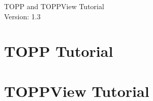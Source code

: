 \documentclass[a4paper]{article}
\begin{document}
\begin{titlepage}
\vspace*{7cm}
\begin{center}
{\Large TOPP and TOPPView Tutorial\\[1ex]\large Version: 1.3 }\\
\end{center}
\end{titlepage}


\setcounter{tocdepth}{2}
\tableofcontents
\pagebreak

\section{TOPP Tutorial}
	
	
	\pagebreak
	
	\pagebreak
	
	\pagebreak
	
	\pagebreak
	
	\pagebreak
	
	\pagebreak
	
	\pagebreak
	
	\pagebreak
	
	\pagebreak
	

\section{TOPPView Tutorial}
	
	
	\pagebreak
	
	\pagebreak
	
	\pagebreak
	
	\pagebreak
	
	\pagebreak
	
\end{document}
